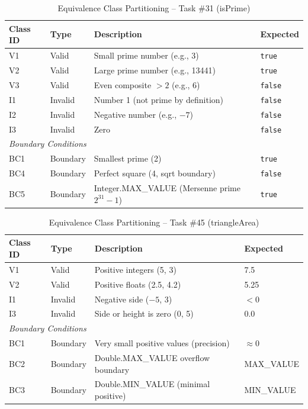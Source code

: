 \documentclass[12pt, a4paper]{article}
\begin{document}
\begin{table}[H]
\centering
\caption{Equivalence Class Partitioning -- Task \#31 (isPrime)}
\label{tab:ecp-task31}
\begin{tabularx}{\textwidth}{l l X l}
\toprule
\textbf{Class ID} & \textbf{Type} & \textbf{Description} & \textbf{Expected} \\
\midrule
V1 & Valid   & Small prime number (e.g., 3) & \texttt{true} \\
V2 & Valid   & Large prime number (e.g., 13441) & \texttt{true} \\
V3 & Valid   & Even composite $> 2$ (e.g., 6) & \texttt{false} \\
I1 & Invalid & Number 1 (not prime by definition) & \texttt{false} \\
I2 & Invalid & Negative number (e.g., $-7$) & \texttt{false} \\
I3 & Invalid & Zero & \texttt{false} \\
\midrule
\multicolumn{4}{l}{\textit{Boundary Conditions}} \\
\midrule
BC1 & Boundary & Smallest prime (2) & \texttt{true} \\
BC4 & Boundary & Perfect square (4, sqrt boundary) & \texttt{false} \\
BC5 & Boundary & Integer.MAX\_VALUE (Mersenne prime $2^{31}-1$) & \texttt{true} \\
\bottomrule
\end{tabularx}
\end{table}

\begin{table}[H]
\centering
\caption{Equivalence Class Partitioning -- Task \#45 (triangleArea)}
\label{tab:ecp-task45}
\begin{tabularx}{\textwidth}{l l X l}
\toprule
\textbf{Class ID} & \textbf{Type} & \textbf{Description} & \textbf{Expected} \\
\midrule
V1 & Valid   & Positive integers (5, 3) & 7.5 \\
V2 & Valid   & Positive floats (2.5, 4.2) & 5.25 \\
I1 & Invalid & Negative side ($-5$, 3) & $< 0$ \\
I3 & Invalid & Side or height is zero (0, 5) & 0.0 \\
\midrule
\multicolumn{4}{l}{\textit{Boundary Conditions}} \\
\midrule
BC1 & Boundary & Very small positive values (precision) & $\approx 0$ \\
BC2 & Boundary & Double.MAX\_VALUE overflow boundary & MAX\_VALUE \\
BC3 & Boundary & Double.MIN\_VALUE (minimal positive) & MIN\_VALUE \\
\bottomrule
\end{tabularx}
\end{table}
\end{document}
